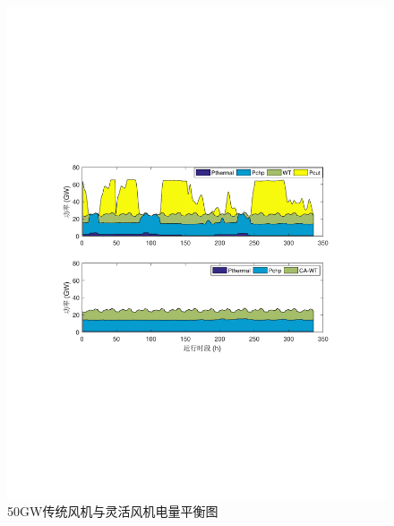 \begin{figure}[H] %
  \centering
  \includegraphics[scale=0.85]{figures/Chap5-Power-Balance-50G-WT.pdf}
  \caption{50GW传统风机与灵活风机电量平衡图}
  \label{fig:Power-Balance-50G-WT}
\end{figure}
